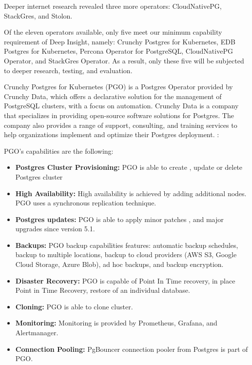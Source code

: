 Deeper internet research revealed three more operators: CloudNativePG, StackGres, and Stolon. \cite{PostgresOnKubernetes} \cite{PalarkComparingKubernetes}

Of the eleven operators available, only five meet our minimum capability requirement of Deep Insight, namely: Crunchy Postgres for Kubernetes, EDB Postgres for Kubernetes, Percona Operator for PostgreSQL, CloudNativePG Operator, and StackGres Operator. As a result, only these five will be subjected to deeper research, testing, and evaluation.

\pagebreak
{}
Crunchy Postgres for Kubernetes (PGO) is a Postgres Operator provided by Crunchy Data, which offers a declarative solution for the management of PostgreSQL clusters, with a focus on automation.
Crunchy Data is a company that specializes in providing open-source software solutions for Postgres. The company also provides a range of support, consulting, and training services to help organizations implement and optimize their Postgres deployment. \cite{Crunchy}:

PGO’s capabilities are the following:
\begin{itemize}
  \item \textbf{Postgres Cluster Provisioning:} PGO is able to create \cite{CrunchyDocCreate}, update \cite{CrunchyDocUpdate} or delete Postgres cluster \cite{CrunchyDocDelete}
  \item \textbf{High Availability:} High availability is achieved by adding additional nodes. PGO uses a synchronous replication technique. \cite{CrunchyDocHA}
  \item \textbf{Postgres updates:} PGO is able to apply minor patches \cite{CrunchyDocMinorUpdates}, and major upgrades since version 5.1. \cite{CrunchyBlogUpdates}
  \item \textbf{Backups:} PGO backup capabilities features: automatic backup schedules, backup to multiple locations, backup to cloud providers (AWS S3, Google Cloud Storage, Azure Blob), ad hoc backups, and backup encryption. \cite{CrunchyDocBackups}
  \item \textbf{Disaster Recovery:} PGO is capable of Point In Time recovery, in place Point in Time Recovery, restore of an individual database. \cite{CrunchyDocDisasterRecovery}
  \item \textbf{Cloning:} PGO is able to clone cluster. \cite{CrunchyDocDisasterRecovery}
  \item \textbf{Monitoring:} Monitoring is provided by Prometheus, Grafana, and Alertmanager. \cite{CrunchyDocMonitoring}
  \item \textbf{Connection Pooling:} PgBouncer connection pooler from Postgres is part of PGO. \cite{CrunchyDocConnectionPooling}
\end{itemize}


